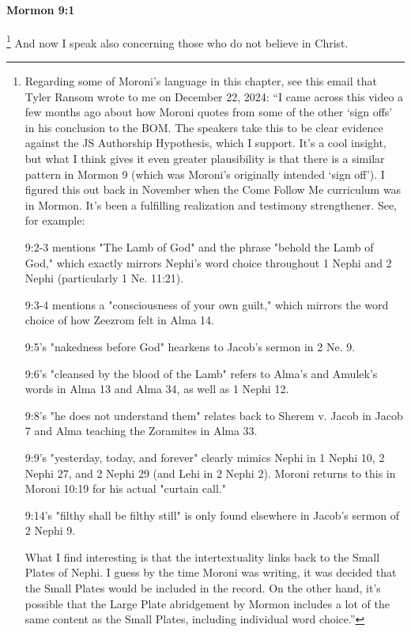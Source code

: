 		\paragraph{Mormon 9:1} %
			\label{MORMON-9-1}
			
			\footnote{%
				Regarding some of Moroni's language in this chapter, see this email that Tyler Ransom wrote to me on December 22, 2024: ``I came across this video a few months ago about how Moroni quotes from some of the other `sign offs' in his conclusion to the BOM. The speakers take this to be clear evidence against the JS Authorship Hypothesis, which I support. It's a cool insight, but what I think gives it even greater plausibility is that there is a similar pattern in Mormon 9 (which was Moroni's originally intended `sign off'). I figured this out back in November when the Come Follow Me curriculum was in Mormon. It's been a fulfilling realization and testimony strengthener. See, for example:
					\begin{compactitem}
						\item 9:2-3 mentions "The Lamb of God" and the phrase "behold the Lamb of God," which exactly mirrors Nephi's word choice throughout 1 Nephi and 2 Nephi (particularly 1 Ne. 11:21).
						\item 9:3-4 mentions a "consciousness of your own guilt," which mirrors the word choice of how Zeezrom felt in Alma 14.
						\item 9:5's "nakedness before God" hearkens to Jacob's sermon in 2 Ne. 9.
						\item 9:6's "cleansed by the blood of the Lamb" refers to Alma's and Amulek's words in Alma 13 and Alma 34, as well as 1 Nephi 12.
						\item 9:8's "he does not understand them" relates back to Sherem v. Jacob in Jacob 7 and Alma teaching the Zoramites in Alma 33.
						\item 9:9's "yesterday, today, and forever" clearly mimics Nephi in 1 Nephi 10, 2 Nephi 27, and 2 Nephi 29 (and Lehi in 2 Nephi 2). Moroni returns to this in Moroni 10:19 for his actual "curtain call."
						\item 9:14's "filthy shall be filthy still" is only found elsewhere in Jacob's sermon of 2 Nephi 9.
					\end{compactitem}
				What I find interesting is that the intertextuality links back to the Small Plates of Nephi. I guess by the time Moroni was writing, it was decided that the Small Plates would be included in the record. On the other hand, it's possible that the Large Plate abridgement by Mormon includes a lot of the same content as the Small Plates, including individual word choice.''
				}%
			And now I speak also concerning those who do not believe in Christ.

